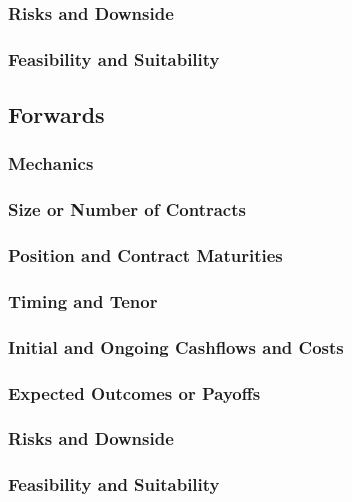 \documentclass[11pt, a4paper, british]{article}
\begin{document}
\subsubsection{Risks and Downside}

\subsubsection{Feasibility and Suitability}

\newpage

\subsection{Forwards}

\subsubsection{Mechanics}

\subsubsection{Size or Number of Contracts}

\subsubsection{Position and Contract Maturities}

\subsubsection{Timing and Tenor}

\subsubsection{Initial and Ongoing Cashflows and Costs}

\subsubsection{Expected Outcomes or Payoffs}

\subsubsection{Risks and Downside}

\subsubsection{Feasibility and Suitability}
\end{document}
